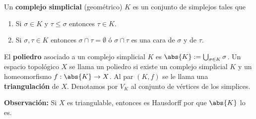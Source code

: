 \documentclass{article}
\begin{document}
\begin{center}
\end{center}

\vspace{2mm}
\begin{dfn}
    Un \textbf{complejo simplicial} (geométrico) $K$ es un conjunto de simplejos tales que
    \begin{enumerate}
        \item Si $\sigma\in K$ y $\tau\leq\sigma$ entonces $\tau\in K$.
        \item Si $\sigma,\tau\in K$ entonces $\sigma\cap\tau=\emptyset$ ó $\sigma\cap\tau$ es una
        cara de $\sigma$ y de $\tau$.
    \end{enumerate}
\end{dfn}
\noindent El \textbf{poliedro} asociado a un complejo simplicial $K$ es 
$\abs{K}:=\bigcup_{\sigma\in K}\sigma$. Un espacio topológico $X$ se llama un poliedro si existe
un complejo simplicial $K$ y un homeomorfismo $f:\abs{K}\to X$. Al par $(K,f)$ se le llama una 
\textbf{triangulación} de $X$. Denotamos por $V_{K}$ al conjunto de vértices de los simplices.

\vspace{2mm}
\noindent\textbf{Observación:} Si $X$ es triangulable, entonces es Hausdorff por que $\abs{K}$ 
lo es.
\end{document}
